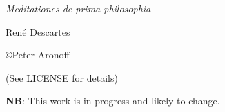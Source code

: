 \begin{titlepage}

\begin{center}

\huge \textit{Meditationes de prima philosophia}

\huge René Descartes 

\vskip2in

\large \copyright Peter Aronoff \the\year

(See LICENSE for details)

\vskip1in

\textbf{NB}: This work is in progress and likely to change.

\vskip2in

\newpage

\end{center}

\end{titlepage}

